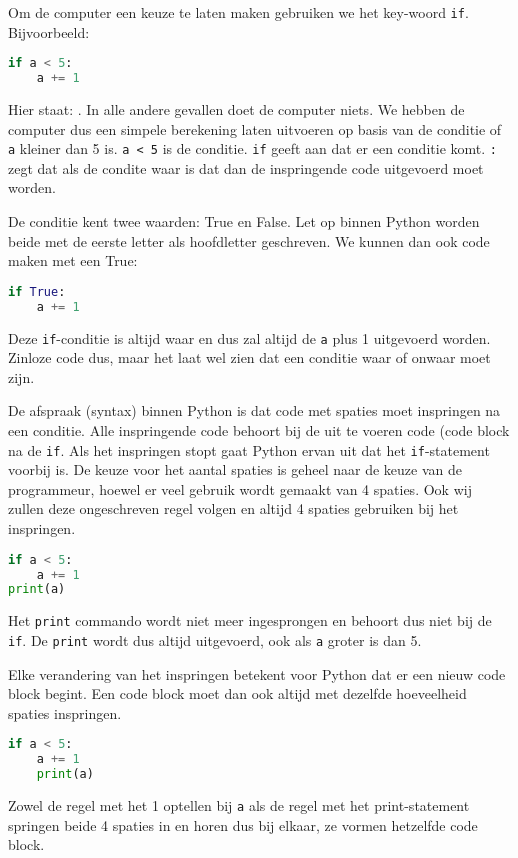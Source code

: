 Om de computer een keuze te laten maken gebruiken we het key-woord \texttt{if}. Bijvoorbeeld:
\begin{lstlisting}[language=python]
if a < 5:
    a += 1
\end{lstlisting}
Hier staat: . In alle andere gevallen doet de computer niets. We hebben de computer dus een simpele berekening laten uitvoeren op basis van de conditie of \texttt{a} kleiner dan 5 is. \texttt{a < 5} is de conditie. \texttt{if} geeft aan dat er een conditie komt. \texttt{:} zegt dat als de condite waar is dat dan de inspringende code uitgevoerd moet worden.

De conditie kent twee waarden: True en False. Let op binnen Python worden beide met de eerste letter als hoofdletter geschreven. We kunnen dan ook code maken met een True:
\begin{lstlisting}[language=python]
if True:
    a += 1
\end{lstlisting}
Deze \texttt{if}-conditie is altijd waar en dus zal altijd de \texttt{a} plus 1 uitgevoerd worden. Zinloze code dus, maar het laat wel zien dat een conditie waar of onwaar moet zijn.

De afspraak (syntax) binnen Python is dat code met spaties moet inspringen na een conditie. Alle inspringende code behoort bij de uit te voeren code (code block na de \texttt{if}. Als het inspringen stopt gaat Python ervan uit dat het \texttt{if}-statement voorbij is. De keuze voor het aantal spaties is geheel naar de keuze van de programmeur, hoewel er veel gebruik wordt gemaakt van 4 spaties. Ook wij zullen deze ongeschreven regel volgen en altijd 4 spaties gebruiken bij het inspringen.
\begin{lstlisting}[language=python]
if a < 5:
    a += 1
print(a)
\end{lstlisting}
Het \texttt{print} commando wordt niet meer ingesprongen en behoort dus niet bij de \texttt{if}. De \texttt{print} wordt dus altijd uitgevoerd, ook als \texttt{a} groter is dan 5.

Elke verandering van het inspringen betekent voor Python dat er een nieuw code block begint. Een code block moet dan ook altijd met dezelfde hoeveelheid spaties inspringen.
\begin{lstlisting}[language=python]
if a < 5:
    a += 1
    print(a)
\end{lstlisting}
Zowel de regel met het 1 optellen bij \texttt{a} als de regel met het print-statement springen beide 4 spaties in en horen dus bij elkaar, ze vormen hetzelfde code block.

